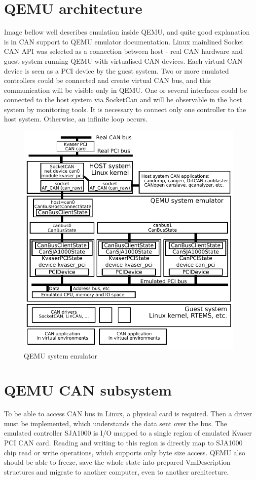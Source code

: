 \documentclass{ctuthesis}
\begin{document}
 \section{QEMU architecture}
  Image bellow well describes emulation inside QEMU, and quite good explanation is in CAN support to QEMU emulator documentation. \cite[page 2-4]{qemu-mainline}
  Linux mainlined Socket CAN API was selected as a connection between host - real CAN hardware and guest system running QEMU with virtualised CAN devices. Each virtual CAN device is seen as a PCI device by the guest system.
  Two or more emulated controllers could be connected and create virtual CAN bus, and this communication will be visible only in QEMU. One or several interfaces could be connected to the host system via SocketCan and will be observable in the host system by monitoring tools. It is necessary to connect only one controller to the host system. Otherwise, an infinite loop occurs.
  \begin{figure}[H]
  \includegraphics[width=1\textwidth]{qemu-can-bus}
  \caption{QEMU system emulator \cite{qemu-canbusexplain}}
  \end{figure}
 
 \section{QEMU CAN subsystem}
  To be able to access CAN bus in Linux, a physical card is required. Then a driver must be implemented, which understands the data sent over the bus. 
  The emulated controller SJA1000 is I/O mapped to a single region of emulated Kvaser PCI CAN card. Reading and writing to this region is directly map to SJA1000 chip read or write operations, which supports only byte size access.
  QEMU also should be able to freeze, save the whole state into prepared VmDescription structures and migrate to another computer, even to another architecture.
\end{document}
